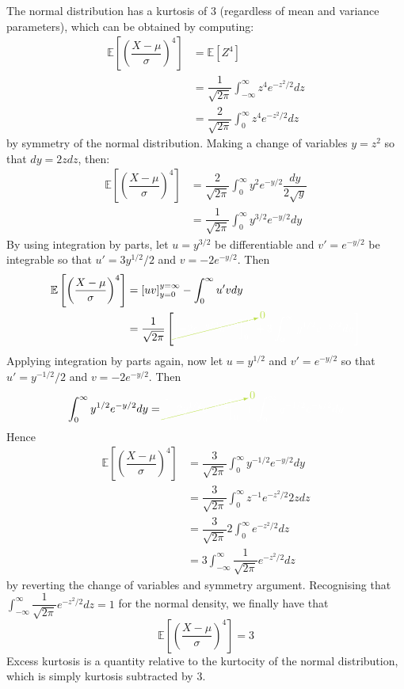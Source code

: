 \documentclass[11pt]{report} %
\begin{document}
The normal distribution has a kurtosis of $3$ (regardless of mean and variance parameters), which can be obtained by computing:
\begin{align}
\mathbb{E}\left[\left(\dfrac{X - \mu}{\sigma}\right)^{4}\right] &= \mathbb{E}\left[Z^{4}\right] \\
&= \dfrac{1}{\sqrt{2\pi}}\int_{-\infty}^{\infty}z^{4}e^{-z^{2}/2}dz \\
&= \dfrac{2}{\sqrt{2\pi}}\int_{0}^{\infty}z^{4}e^{-z^{2}/2}dz
\end{align}
by symmetry of the normal distribution. Making a change of variables $y = z^{2}$ so that $dy = 2z dz$, then:
\begin{align}
\mathbb{E}\left[\left(\dfrac{X - \mu}{\sigma}\right)^{4}\right] &= \dfrac{2}{\sqrt{2\pi}}\int_{0}^{\infty}y^{2}e^{-y/2}\dfrac{dy}{2\sqrt{y}} \\
&= \dfrac{1}{\sqrt{2\pi}}\int_{0}^{\infty}y^{3/2}e^{-y/2}dy
\end{align}
By using integration by parts, let $u = y^{3/2}$ be differentiable and $v' = e^{-y/2}$ be integrable so that $u' = 3y^{1/2}/2$ and $v = -2e^{-y/2}$. Then
\begin{align}
\mathbb{E}\left[\left(\dfrac{X - \mu}{\sigma}\right)^{4}\right] &= \left[uv\right]_{y = 0}^{y = \infty} - \int_{0}^{\infty}u'vdy \\
&= \dfrac{1}{\sqrt{2\pi}}\left[\green \cancelto{\green 0}{\black\left[-2e^{-y/2}y^{3/2}\right]_{0}^{\infty}}\black + 3\int_{0}^{\infty}y^{1/2}e^{-y/2}dy\right]
\end{align}
Applying integration by parts again, now let $u = y^{1/2}$ and $v' = e^{-y/2}$ so that $u' = y^{-1/2}/2$ and $v = -2e^{-y/2}$. Then
\begin{equation}
\int_{0}^{\infty}y^{1/2}e^{-y/2}dy = \green\cancelto{\green 0}{\black \left[-2y^{1/2}e^{-y/2}\right]_{0}^{\infty}}\black + \int_{0}^{\infty}y^{-1/2}e^{-y/2}dy
\end{equation}
Hence
\begin{align}
\mathbb{E}\left[\left(\dfrac{X - \mu}{\sigma}\right)^{4}\right] &= \dfrac{3}{\sqrt{2\pi}}\int_{0}^{\infty}y^{-1/2}e^{-y/2}dy \\
&= \dfrac{3}{\sqrt{2\pi}}\int_{0}^{\infty}z^{-1}e^{-z^{2}/2}2zdz \\
&= \dfrac{3}{\sqrt{2\pi}}2\int_{0}^{\infty}e^{-z^{2}/2}dz \\
&= 3\int_{-\infty}^{\infty}\dfrac{1}{\sqrt{2\pi}}e^{-z^{2}/2}dz
\end{align}
by reverting the change of variables and symmetry argument. Recognising that $\int_{-\infty}^{\infty}\dfrac{1}{\sqrt{2\pi}}e^{-z^{2}/2}dz = 1$ for the normal density, we finally have that
\begin{equation}
\mathbb{E}\left[\left(\dfrac{X - \mu}{\sigma}\right)^{4}\right] = 3
\end{equation}
Excess kurtosis is a quantity relative to the kurtocity of the normal distribution, which is simply kurtosis subtracted by $3$.
\end{document}
